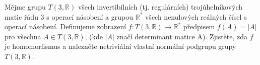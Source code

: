 \subsubsection{}
Mějme grupu $T(3, \mathbb{R})$ všech invertibilních (tj. regulárních)
trojúhelníkových matic řádu 3 s operací násobení a grupou $\mathbb{R}^{*}$ všech
nenulových reálných čísel s operací násobení. Definujeme zobrazení $f:T(3,
\mathbb{R}) \rightarrow \mathbb{R}^{*}$ předpisem $f(A)=\left |  A\right |$ pro
všechna $A \in T(3, \mathbb{R})$, (kde $\left |  A\right |$ značí determinant
matice A). Zjistěte, zda $f$ je homomorfismus a nalezněte netriviální vlastní
normální podgrupu grupy $T(3, \mathbb{R})$.
